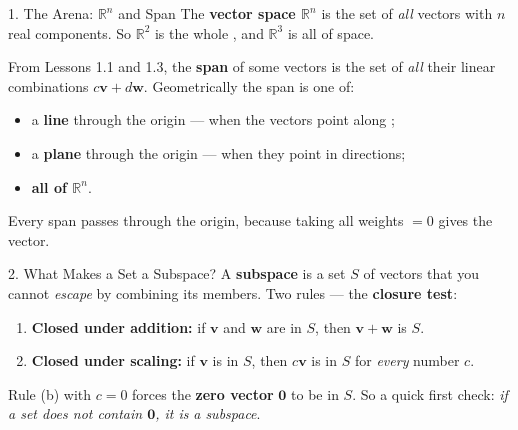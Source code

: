 \documentclass[10pt]{article}
\newcommand{\vv}{\mathbf{v}}
\newcommand{\ww}{\mathbf{w}}
\newcommand{\zero}{\mathbf{0}}
\begin{document}
\begin{notesbox}{1. The Arena: $\mathbb{R}^n$ and Span}
The \textbf{vector space $\mathbb{R}^n$} is the set of \emph{all} vectors with $n$ real
components. So $\mathbb{R}^2$ is the whole \blank{2.4cm}, and $\mathbb{R}^3$ is all of space.

\vspace{3pt}
From Lessons 1.1 and 1.3, the \textbf{span} of some vectors is the set of \emph{all} their linear
combinations $c\vv + d\ww$. Geometrically the span is one of:
\begin{itemize}[leftmargin=1.5em, itemsep=1pt]
  \item a \textbf{line} through the origin --- when the vectors point along \blank{3.0cm};
  \item a \textbf{plane} through the origin --- when they point in \blank{3.4cm} directions;
  \item \textbf{all of $\mathbb{R}^n$}.
\end{itemize}
Every span passes through the origin, because taking all weights $=0$ gives the \blank{1.8cm}
vector.
\end{notesbox}

\begin{notesbox}{2. What Makes a Set a Subspace?}
A \textbf{subspace} is a set $S$ of vectors that you cannot \emph{escape} by combining its
members. Two rules --- the \textbf{closure test}:
\begin{enumerate}[leftmargin=1.9em, itemsep=3pt]
  \item[\textbf{(a)}] \textbf{Closed under addition:} if $\vv$ and $\ww$ are in $S$, then
        $\vv+\ww$ is \blank{2.6cm} $S$.
  \item[\textbf{(b)}] \textbf{Closed under scaling:} if $\vv$ is in $S$, then $c\vv$ is in $S$ for
        \emph{every} number $c$.
\end{enumerate}
Rule (b) with $c=0$ forces the \textbf{zero vector} $\zero$ to be in $S$. So a quick first check:
\emph{if a set does not contain $\zero$, it is} \blank{3.2cm} \emph{a subspace}.
\end{notesbox}
\end{document}
